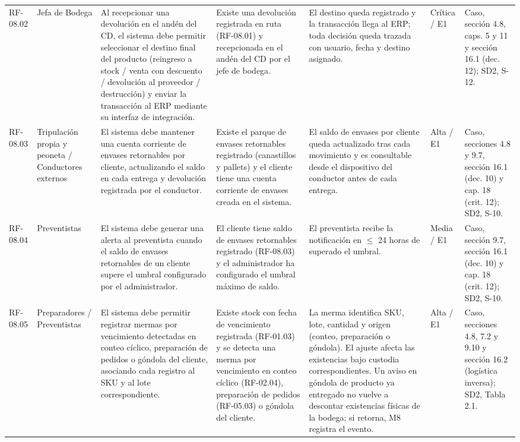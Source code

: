 {\begin{longtable}{@{}F{0.062} F{0.080} F{0.195} F{0.160} F{0.240} F{0.093} F{0.170}@{}}
  RF-08.02 & Jefa de Bodega & Al recepcionar una devolución en el andén del CD, el sistema debe permitir seleccionar el destino final del producto (reingreso a stock / venta con descuento / devolución al proveedor / destrucción) y enviar la transacción al ERP mediante su interfaz de integración. & Existe una devolución registrada en ruta (RF-08.01) y recepcionada en el andén del CD por el jefe de bodega. & El destino queda registrado y la transacción llega al ERP; toda decisión queda trazada con usuario, fecha y destino asignado. & Crítica / E1 & Caso, sección 4.8, caps. 5 y 11 y sección 16.1 (dec. 12); SD2, S-12. \\
  RF-08.03 & Tripulación propia y peoneta / Conductores externos & El sistema debe mantener una cuenta corriente de envases retornables por cliente, actualizando el saldo en cada entrega y devolución registrada por el conductor. & Existe el parque de envases retornables registrado (canastillos y pallets) y el cliente tiene una cuenta corriente de envases creada en el sistema. & El saldo de envases por cliente queda actualizado tras cada movimiento y es consultable desde el dispositivo del conductor antes de cada entrega. & Alta / E1 & Caso, secciones 4.8 y 9.7, sección 16.1 (dec. 10) y cap. 18 (crit. 12); SD2, S-10. \\
  RF-08.04 & Preventistas & El sistema debe generar una alerta al preventista cuando el saldo de envases retornables de un cliente supere el umbral configurado por el administrador. & El cliente tiene saldo de envases retornables registrado (RF-08.03) y el administrador ha configurado el umbral máximo de saldo. & El preventista recibe la notificación en $\le$ 24 horas de superado el umbral. & Media / E1 & Caso, sección 9.7, sección 16.1 (dec. 10) y cap. 18 (crit. 12); SD2, S-10. \\
  RF-08.05 & Preparadores / Preventistas & El sistema debe permitir registrar mermas por vencimiento detectadas en conteo cíclico, preparación de pedidos o góndola del cliente, asociando cada registro al SKU y al lote correspondiente. & Existe stock con fecha de vencimiento registrada (RF-01.03) y se detecta una merma por vencimiento en conteo cíclico (RF-02.04), preparación de pedidos (RF-05.03) o góndola del cliente. & La merma identifica SKU, lote, cantidad y origen (conteo, preparación o góndola). El ajuste afecta las existencias bajo custodia correspondientes. Un aviso en góndola de producto ya entregado no vuelve a descontar existencias físicas de la bodega; si retorna, M8 registra el evento. & Alta / E1 & Caso, secciones 4.8, 7.2 y 9.10 y sección 16.2 (logística inversa); SD2, Tabla 2.1. \\

\end{longtable}}
